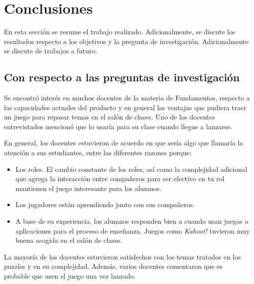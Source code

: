 \chapter{Conclusiones}\label{conclusiones}
 
 En esta sección se resume el trabajo realizado. Adicionalmente, se discute los resultados respecto a los objetivos y la pregunta de investigación. Adicionalmente se discute de trabajos a futuro.
 
\section{Con respecto a las preguntas de investigación}

Se encontró interés en muchos docentes de la materia de Fundamentos, respecto a las capacidades actuales del producto y en general las ventajas que pudiera traer un juego para repasar temas en el salón de clases. Uno de los docentes entrevistados mencionó que lo usaría para su clase cuando llegue a lanzarse. 

En general, los docentes estuvieron de acuerdo en que sería algo que llamaría la atención a sus estudiantes, entre las diferentes razones porque:
\begin{itemize}
    \item Los roles. El cambio constante de los roles, así como la complejidad adicional que agrega la interacción entre compañeros para ser efectivo en tu rol mantienen el juego interesante para los alumnos.
    \item Los jugadores están aprendiendo junto con sus compañeros.
    \item A base de su experiencia, los alumnos responden bien a cuando usan juegos o aplicaciones para el proceso de enseñanza. Juegos como \textit{Kahoot!} tuvieron muy buena acogida  en el salón de clases.
\end{itemize}

La mayoría de los docentes estuvieron satisfechos con los temas tratados en los puzzles y en su complejidad. Además, varios docentes comentaron que es probable que usen el juego una vez lanzado.

